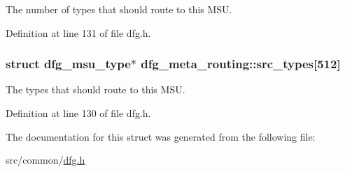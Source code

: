 The number of types that should route to this M\-S\-U. 



Definition at line 131 of file dfg.\-h.

\hypertarget{structdfg__meta__routing_afee7eace401506a5212d4dfd2fafbfcf}{
\subsubsection[{src\-\_\-types}]{\setlength{\rightskip}{0pt plus 5cm}struct {\bf dfg\-\_\-msu\-\_\-type}$\ast$ dfg\-\_\-meta\-\_\-routing\-::src\-\_\-types\mbox{[}512\mbox{]}}}\label{structdfg__meta__routing_afee7eace401506a5212d4dfd2fafbfcf}


The types that should route to this M\-S\-U. 



Definition at line 130 of file dfg.\-h.



The documentation for this struct was generated from the following file\-:\begin{DoxyCompactItemize}
\item 
src/common/\hyperlink{dfg_8h}{dfg.\-h}\end{DoxyCompactItemize}
